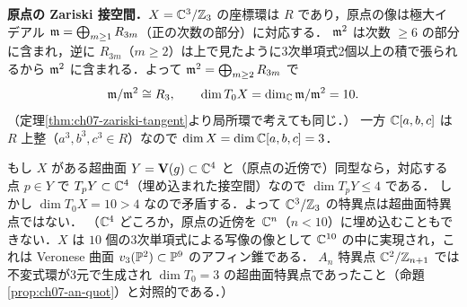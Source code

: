 \textbf{原点の Zariski 接空間．}$X=\mathbb{C}^3/\mathbb{Z}_3$ の座標環は $R$ であり，原点の像は極大イデアル $\mathfrak{m}=\bigoplus_{m\ge1}R_{3m}$（正の次数の部分）に対応する．
$\mathfrak{m}^2$ は次数 $\ge6$ の部分に含まれ，逆に $R_{3m}$（$m\ge2$）は上で見たように3次単項式2個以上の積で張られるから $\mathfrak{m}^2$ に含まれる．よって $\mathfrak{m}^2=\bigoplus_{m\ge2}R_{3m}$ で
\[
  \mathfrak{m}/\mathfrak{m}^2\cong R_3,\qquad \dim T_0X=\dim_{\mathbb{C}}\mathfrak{m}/\mathfrak{m}^2=10.
\]
（定理\ref{thm:ch07-zariski-tangent}より局所環で考えても同じ．）
一方 $\mathbb{C}[a,b,c]$ は $R$ 上整（$a^3,b^3,c^3\in R$）なので $\dim X=\dim\mathbb{C}[a,b,c]=3$．

もし $X$ がある超曲面 $Y=\mathbf{V}(g)\subset\mathbb{C}^4$ と（原点の近傍で）同型なら，対応する点 $p\in Y$ で $T_pY\subset\mathbb{C}^4$（埋め込まれた接空間）なので $\dim T_pY\le4$ である．
しかし $\dim T_0X=10>4$ なので矛盾する．よって $\mathbb{C}^3/\mathbb{Z}_3$ の特異点は超曲面特異点ではない．
（$\mathbb{C}^4$ どころか，原点の近傍を $\mathbb{C}^n$（$n<10$）に埋め込むこともできない．$X$ は $10$ 個の3次単項式による写像の像として $\mathbb{C}^{10}$ の中に実現され，これは Veronese 曲面 $v_3(\mathbb{P}^2)\subset\mathbb{P}^9$ のアフィン錐である．
$A_n$ 特異点 $\mathbb{C}^2/\mathbb{Z}_{n+1}$ では不変式環が3元で生成され $\dim T_0=3$ の超曲面特異点であったこと（命題\ref{prop:ch07-an-quot}）と対照的である．）
